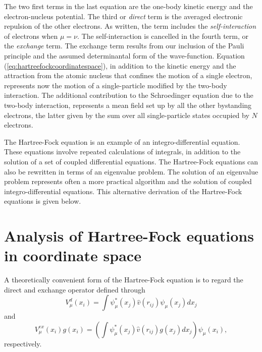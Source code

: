 \documentclass[graybox,sectrefs,envcountresetchap,open=right]{svmonodo}
\begin{document}
The two first terms in the last equation are the one-body kinetic energy and the
electron-nucleus potential. The third or \emph{direct} term is the averaged electronic repulsion of the other
electrons. As written, the
term includes the \emph{self-interaction} of 
electrons when $\mu=\nu$. The self-interaction is cancelled in the fourth
term, or the \emph{exchange} term. The exchange term results from our
inclusion of the Pauli principle and the assumed determinantal form of
the wave-function. Equation (\ref{eq:hartreefockcoordinatespace}), in addition to the kinetic energy and the attraction from the atomic nucleus that confines the motion of a single electron,   represents now the motion of a single-particle modified by the two-body interaction. The additional contribution to the Schroedinger equation due to the two-body interaction, represents a mean field set up by all the other bystanding electrons, the latter given by the sum over all single-particle states occupied by $N$ electrons. 

The Hartree-Fock equation is an example of an integro-differential equation. These equations involve repeated calculations of integrals, in addition to the solution of a set of coupled differential equations. 
The Hartree-Fock equations can also be rewritten in terms of an eigenvalue problem. The solution of an eigenvalue problem represents often a more practical algorithm and the  solution of  coupled  integro-differential equations.
This alternative derivation of the Hartree-Fock equations is given below.




\section{Analysis of Hartree-Fock equations in coordinate space}

  A theoretically convenient form of the
Hartree-Fock equation is to regard the direct and exchange operator
defined through 
\begin{equation*}
  V_{\mu}^{d}(x_i) = \int \psi_{\mu}^*(x_j) 
 \hat{v}(r_{ij})\psi_{\mu}(x_j) dx_j
\end{equation*}
and
\begin{equation*}
  V_{\mu}^{ex}(x_i) g(x_i) 
  = \left(\int \psi_{\mu}^*(x_j) 
 \hat{v}(r_{ij})g(x_j) dx_j
  \right)\psi_{\mu}(x_i),
\end{equation*}
respectively. 
\end{document}
